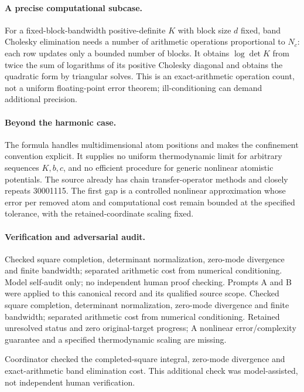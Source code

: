 \documentclass[11pt]{article}
\begin{document}
\paragraph{A precise computational subcase.} For a fixed-block-bandwidth positive-definite $K$ with block size $d$ fixed, band Cholesky elimination needs a number of arithmetic operations proportional to $N_c$: each row updates only a bounded number of blocks. It obtains $\log\det K$ from twice the sum of logarithms of its positive Cholesky diagonal and obtains the quadratic form by triangular solves. This is an exact-arithmetic operation count, not a uniform floating-point error theorem; ill-conditioning can demand additional precision.

\paragraph{Beyond the harmonic case.} The formula handles multidimensional atom positions and makes the confinement convention explicit. It supplies no uniform thermodynamic limit for arbitrary sequences $K,b,c$, and no efficient procedure for generic nonlinear atomistic potentials. The source already has chain transfer-operator methods and closely repeats 30001115. The first gap is a controlled nonlinear approximation whose error per removed atom and computational cost remain bounded at the specified tolerance, with the retained-coordinate scaling fixed.

\paragraph{Verification and adversarial audit.}
Checked square completion, determinant normalization, zero-mode divergence and finite bandwidth; separated arithmetic cost from numerical conditioning. Model self-audit only; no independent human proof checking. Prompts A and B were applied to this canonical record and its qualified source scope. Checked square completion, determinant normalization, zero-mode divergence and finite bandwidth; separated arithmetic cost from numerical conditioning. Retained unresolved status and zero original-target progress; A nonlinear error/complexity guarantee and a specified thermodynamic scaling are missing.

Coordinator checked the completed-square integral, zero-mode divergence and exact-arithmetic band elimination cost. This additional check was model-assisted, not independent human verification.
\end{document}
